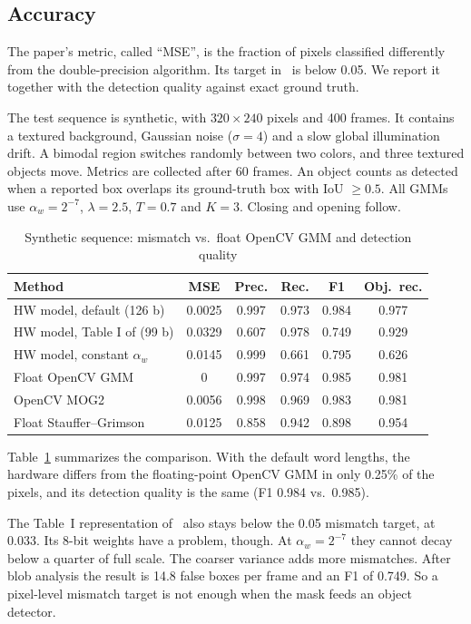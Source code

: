 \documentclass[conference]{IEEEtran}
\begin{document}
\subsection{Accuracy}
The paper's metric, called ``MSE'', is the fraction of pixels classified
differently from the double-precision algorithm. Its target in~\cite{genovese2014}
is below 0.05. We report it together with the detection quality against exact
ground truth.

The test sequence is synthetic, with $320\times240$ pixels and 400 frames. It
contains a textured background, Gaussian noise ($\sigma=4$) and a slow global
illumination drift. A bimodal region switches randomly between two colors, and
three textured objects move. Metrics are collected after 60 frames. An object
counts as detected when a reported box overlaps its ground-truth box with
IoU $\ge 0.5$. All GMMs use $\alpha_w=2^{-7}$, $\lambda=2.5$, $T=0.7$ and $K=3$.
Closing and opening follow.

\begin{table}[!t]
\caption{Synthetic sequence: mismatch vs.\ float OpenCV GMM and detection quality}
\label{tab:acc}
\centering
\setlength{\tabcolsep}{2.6pt}
\begin{tabular}{@{}lccccc@{}}
\toprule
Method & MSE & Prec. & Rec. & F1 & Obj.\ rec.\\
\midrule
HW model, default (126 b)          & 0.0025 & 0.997 & 0.973 & 0.984 & 0.977\\
HW model, Table I of \cite{genovese2014} (99 b) & 0.0329 & 0.607 & 0.978 & 0.749 & 0.929\\
HW model, constant $\alpha_w$       & 0.0145 & 0.999 & 0.661 & 0.795 & 0.626\\
Float OpenCV GMM \cite{genovese2014} & 0      & 0.997 & 0.974 & 0.985 & 0.981\\
OpenCV MOG2 \cite{zivkovic2004}      & 0.0056 & 0.998 & 0.969 & 0.983 & 0.981\\
Float Stauffer--Grimson \cite{stauffer1999} & 0.0125 & 0.858 & 0.942 & 0.898 & 0.954\\
\bottomrule
\end{tabular}
\end{table}

Table~\ref{tab:acc} summarizes the comparison. With the default word lengths, the
hardware differs from the floating-point OpenCV GMM in only 0.25\% of the
pixels, and its detection quality is the same (F1 0.984 vs.\ 0.985).

The Table~I representation of~\cite{genovese2014} also stays below the 0.05
mismatch target, at 0.033. Its 8-bit weights have a problem, though. At
$\alpha_w=2^{-7}$ they cannot decay below a quarter of full scale. The coarser
variance adds more mismatches. After blob analysis the result is 14.8 false
boxes per frame and an F1 of 0.749. So a pixel-level mismatch target is not
enough when the mask feeds an object detector.
\end{document}

